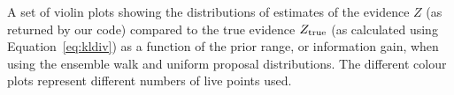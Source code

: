 \label{fig:walkunipropevs}
A set of violin plots showing the distributions of estimates of the evidence
$Z$ (as returned by our code) compared to the true evidence $Z_{\rm true}$ (as
calculated using Equation~\ref{eq:kldiv}) as a function of the prior range,
or information gain, when using the ensemble walk and uniform proposal
distributions. The different colour plots represent different numbers
of live points used.
